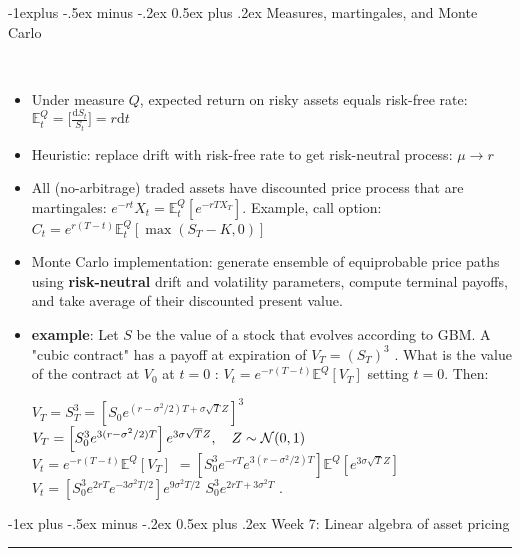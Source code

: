 \documentclass[10pt,landscape,a4paper]{article}
\makeatletter
\renewcommand{\section}{\@startsection{section}{1}{0mm}%
                                {-1ex plus -.5ex minus -.2ex}%
                                {0.5ex plus .2ex}%
                                {\normalfont\large\bfseries}}
\renewcommand{\subsection}{\@startsection{subsection}{2}{0mm}%
                                {-1explus -.5ex minus -.2ex}%
                                {0.5ex plus .2ex}%
                                {\normalfont\normalsize\bfseries}}
\makeatother
\begin{document}
\begin{multicols*}{3}
\begin{description}[topsep=0pt]
\begin{itemize}[topsep=0pt]
	\end{itemize}
\end{description}


\subsection{Measures, martingales, and Monte Carlo}

\begin{description}[topsep=0pt]
	\item[Risk-neutral pricing] ~
	\begin{itemize}[topsep=0pt]
		\item  Under measure $Q$, expected return on risky assets equals risk-free rate: $\mathbb{E}_t^Q=\big[ \frac{\text{d}S_t}{S_t}\big] = r \text{d}t$
		\item Heuristic: replace drift with risk-free rate to get risk-neutral process: $\mu \rightarrow r$
		\item All (no-arbitrage) traded assets have discounted price process that are
		martingales:  $e^{-rt}X_t = \mathbb{E}_t^Q[e^{-rT X_T}]$.  Example, call option: $C_t = e^{r(T-t)} \mathbb{E}_t^Q[\operatorname{max}(S_T-K,0)]$ 
		\item Monte Carlo implementation: generate ensemble of equiprobable price
		paths using \textbf{risk-neutral} drift and volatility parameters, compute terminal
		payoffs, and take average of their discounted present value.
		\item \textbf{example}: Let $S$  be the value of a stock that evolves according to GBM. A "cubic contract" has a payoff at expiration of $V_T=(S_T)^3$ . What is the value  of the contract at $V_0$ at $t=0$ :  $V_t = e^{-r(T-t)}\mathbb{E}^Q[V_T]$ setting $t=0$. Then: 
		
			
			$V_T = S_T^3 = \left[S_0 e^{(r-\sigma^2/2)T + \sigma{\sqrt T}Z}\right]^3$
			$V_T= \left[ S_0^3 e^{3(r-\sigma^2/2)T} \right] e^{3\sigma{\sqrt T}Z}, \quad Z \sim{\cal N}(0,1)$ \\
			$V_t = e^{-r(T-t)}\mathbb{E}^Q[V_T]$
			$= \left[ S_0^3 e^{-rT}e^{3(r-\sigma^2/2)T} \right] \mathbb{E}^Q\left[e^{ 3\sigma{\sqrt T}Z}\right]$ \\
			$V_t= \left[S_0^3 e^{2rT} e^{-3\sigma^2T/2} \right] e^{9\sigma^2 T/2}$ 
			$ S_0^3 e^{2rT+3\sigma^2T}$ .

	
		
	\end{itemize}
\end{description}


\section{Week 7: Linear algebra of asset pricing}\smallskip \hrule height 1pt \smallskip



\end{multicols*}
\end{document}
